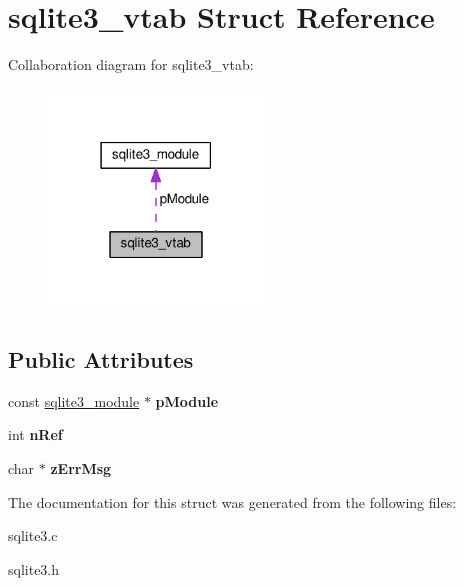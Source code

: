 \hypertarget{structsqlite3__vtab}{}\section{sqlite3\+\_\+vtab Struct Reference}
\label{structsqlite3__vtab}


Collaboration diagram for sqlite3\+\_\+vtab\+:\nopagebreak
\begin{figure}[H]
\begin{center}
\leavevmode
\includegraphics[width=162pt]{structsqlite3__vtab__coll__graph}
\end{center}
\end{figure}
\subsection*{Public Attributes}
\begin{DoxyCompactItemize}
\item 
const \hyperlink{structsqlite3__module}{sqlite3\+\_\+module} $\ast$ {\bfseries p\+Module}\hypertarget{structsqlite3__vtab_acf0d906e36b113669eaa883c5f8b5ba0}{}\label{structsqlite3__vtab_acf0d906e36b113669eaa883c5f8b5ba0}

\item 
int {\bfseries n\+Ref}\hypertarget{structsqlite3__vtab_ab3c80d385849bdd82363a0df7d6fcba8}{}\label{structsqlite3__vtab_ab3c80d385849bdd82363a0df7d6fcba8}

\item 
char $\ast$ {\bfseries z\+Err\+Msg}\hypertarget{structsqlite3__vtab_a47331586775d674ae951b07ebb902fca}{}\label{structsqlite3__vtab_a47331586775d674ae951b07ebb902fca}

\end{DoxyCompactItemize}


The documentation for this struct was generated from the following files\+:\begin{DoxyCompactItemize}
\item 
sqlite3.\+c\item 
sqlite3.\+h\end{DoxyCompactItemize}
